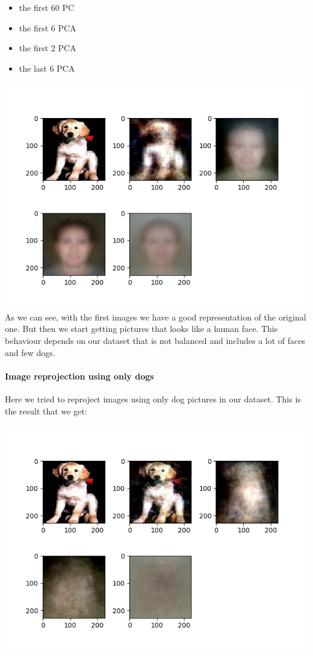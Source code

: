\documentclass{report}
\begin{document}
  \begin{itemize}
  \item the first 60 PC
  \item the first 6 PCA
  \item the first 2 PCA
  \item the last 6 PCA
  \end{itemize}
  \includegraphics{img_01}
  As we can see, with the first images we have a good representation of the original one. But then we start getting pictures that looks like a human face.
  This behaviour depends on our dataset that is not balanced and includes a lot of faces and few dogs.

  \pagebreak
  \paragraph{Image reprojection using only dogs}
  Here we tried to reproject images using only dog pictures in our dataset.
  This is the result that we get:

  \includegraphics{img_02}
\end{document}
